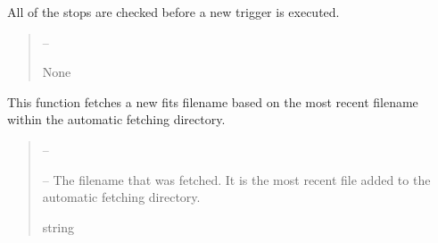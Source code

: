 \documentclass[letterpaper,11pt,english]{sphinxmanual}
\begin{document}
\begin{savenotes}
\begin{fulllineitems}
\begin{savenotes}
\begin{fulllineitems}
\sphinxAtStartPar
All of the stops are checked before a new trigger is executed.
\begin{quote}\begin{description}
\sphinxAtStartPar
{} – 

\sphinxAtStartPar
None

\end{description}\end{quote}

\end{fulllineitems}\end{savenotes}


\begin{savenotes}\begin{fulllineitems}
\label{\detokenize{code/opihiexarata.gui.automatic:opihiexarata.gui.automatic.OpihiAutomaticWindow.fetch_new_filename}}
\pysigstartsignatures
{}
\pysigstopsignatures
\sphinxAtStartPar
This function fetches a new fits filename based on the most recent
filename within the automatic fetching directory.
\begin{quote}\begin{description}
\sphinxAtStartPar
{} – 

\sphinxAtStartPar
{} – The filename that was fetched. It is the most recent file added to
the automatic fetching directory.

\sphinxAtStartPar
string

\end{description}\end{quote}

\end{fulllineitems}\end{savenotes}



\end{fulllineitems}
\end{savenotes}
\end{document}
